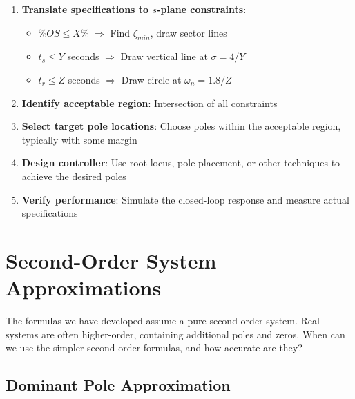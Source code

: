 \begin{enumerate}
    \item \textbf{Translate specifications to $s$-plane constraints}:
    \begin{itemize}
        \item $\%OS \leq X\%$ $\Rightarrow$ Find $\zeta_{min}$, draw sector lines
        \item $t_s \leq Y$ seconds $\Rightarrow$ Draw vertical line at $\sigma = 4/Y$
        \item $t_r \leq Z$ seconds $\Rightarrow$ Draw circle at $\omega_n = 1.8/Z$
    \end{itemize}

    \item \textbf{Identify acceptable region}: Intersection of all constraints

    \item \textbf{Select target pole locations}: Choose poles within the acceptable region, typically with some margin

    \item \textbf{Design controller}: Use root locus, pole placement, or other techniques to achieve the desired poles

    \item \textbf{Verify performance}: Simulate the closed-loop response and measure actual specifications
\end{enumerate}



\section{Second-Order System Approximations}
\label{sec:second_order_approx}

The formulas we have developed assume a pure second-order system. Real systems are often higher-order, containing additional poles and zeros. When can we use the simpler second-order formulas, and how accurate are they?

\subsection{Dominant Pole Approximation}

